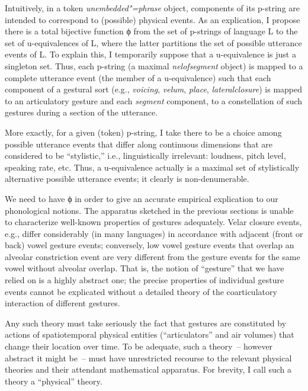 \documentclass[output=paper]{langsci/langscibook}
\begin{document}
Intuitively, in a token \textit{unembedded"=phrase}\/ object, components of its
p-string  are intended to correspond to (possible) physical events. As an
explication, I propose there is a total bijective function ϕ from the
set of p-strings of language L to the set of u-equivalences of L, where the
latter partitions the  set of possible utterance events of L\@. To explain
this, I temporarily suppose that a u-equivalence is just a singleton set.
Thus, each p-string (a maximal \textit{nelofsegment}\/ object) is mapped to a
complete utterance event (the member of a u-equivalence) such that each
component of a gestural sort (e.g., \textit{voicing}, \textit{velum}\/, \textit{place}\/, \textit{lateralclosure}\/) is mapped to an articulatory gesture and
each \textit{segment}\/ component, to a constellation of such gestures during
a section of the utterance.

More exactly, for a given (token) p-string, I take there to be a choice
among possible utterance events that differ along  continuous dimensions
that are  considered to be ``stylistic,'' i.e., linguistically irrelevant:
loudness, pitch level, speaking rate, etc.  Thus, a u-equivalence actually
is a maximal set of stylistically alternative possible utterance events; it
clearly is non-denumerable.


We need to have ϕ in order to give an accurate empirical explication
to our phonological notions. The apparatus sketched in the previous
sections is unable to characterize well-known properties of gestures
adequately. Velar closure events, e.g., differ considerably (in many
languages) in accordance with adjacent (front or back) vowel gesture
events; conversely, low vowel gesture events that overlap an alveolar
constriction event are very different from the gesture events for the same
vowel without alveolar overlap. That is, the notion of ``gesture'' that we
have relied on is a highly abstract one; the precise properties of
individual gesture events cannot be explicated without a detailed theory of
the coarticulatory interaction of different gestures.

Any such theory must take seriously the fact that gestures are constituted
by actions of spatiotemporal physical entities (``articulators'' and air
volumes) that change their location over time. To be adequate, such a
theory~-- however abstract it might be~-- must have unrestricted recourse to
the relevant physical theories and their attendant mathematical apparatus.
For brevity, I call such a theory a ``physical'' theory.
\end{document}
